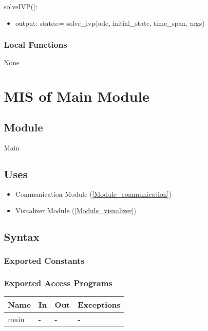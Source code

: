 \documentclass[12pt, titlepage]{article}
\begin{document}
\noindent solveIVP():
\begin{itemize}
\item output: states:= solve\_ivp(ode, initial\_state, time\_span, args)
\end{itemize}

\subsubsection{Local Functions}

None

\newpage

\section{MIS of Main Module} \label{Module_main}
\subsection{Module}

Main

\subsection{Uses}

\begin{itemize}
  \item Communication Module (\ref{Module_communication})
  \item Visualizer Module (\ref{Module_visualizer})
\end{itemize}

\subsection{Syntax}

\subsubsection{Exported Constants}

\subsubsection{Exported Access Programs}

\begin{center}
\begin{tabular}{p{2cm} p{4cm} p{4cm} p{2cm}}
\hline
\textbf{Name} & \textbf{In} & \textbf{Out} & \textbf{Exceptions} \\
\hline
main & - & - & - \\
\hline
\end{tabular}
\end{center}
\end{document}
